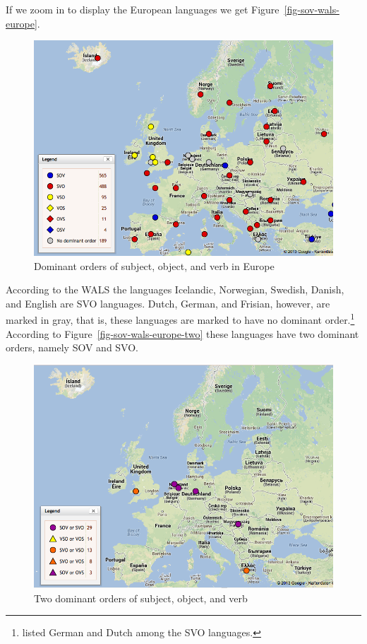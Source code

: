 If we zoom in to display the European languages we get Figure~\vref{fig-sov-wals-europe}.
\begin{figure}
\includegraphics[width=.898\textwidth]{Pictures/WALS-SOV-Europa}
\caption{\label{fig-sov-wals-europe}Dominant orders of subject, object, and verb in Europe}
\end{figure}
According to the WALS the languages Icelandic, Norwegian, Swedish, Danish, and English are SVO
languages. Dutch, German, and Frisian, however, are marked in gray, that is, these languages are
marked to have no dominant order.\footnote{
  \citet[]{Greenberg63a-u} listed German and Dutch among the SVO languages.%
} According to Figure~\vref{fig-sov-wals-europe-two} these languages
have two dominant orders, namely SOV and SVO.
\begin{figure}
\includegraphics[width=.898\textwidth]{Pictures/WALS-SOV-Europa-no-dominant}
\caption{\label{fig-sov-wals-europe-two}%
Two dominant orders of subject, object, and verb \citep[Section~3]{Dryer2013c}}
\end{figure}
